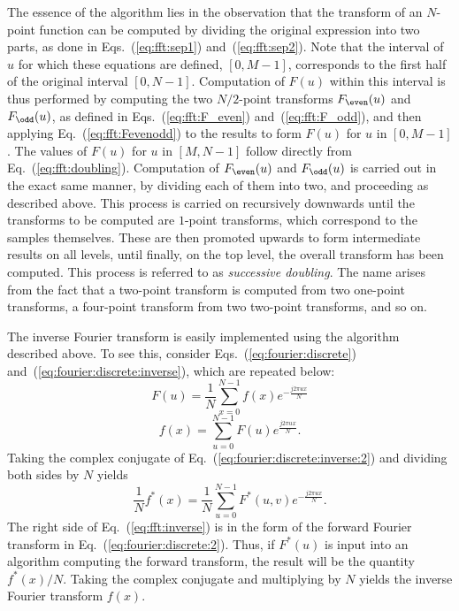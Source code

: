 The essence of the {\fft} algorithm lies in the observation that the
transform of an $N$-point function can be computed by dividing the
original expression into two parts, as done in
Eqs.~(\ref{eq:fft:sep1}) and~(\ref{eq:fft:sep2}).  Note that the
interval of $u$ for which these equations are defined, $[0,M-1]$,
corresponds to the first half of the original interval $[0,N-1]$.
Computation of $F(u)$ within this interval is thus performed by
computing the two $N/2$-point transforms $F_{\even}(u)$ and
$F_{\odd}(u)$, as defined in Eqs.~(\ref{eq:fft:F_even})
and~(\ref{eq:fft:F_odd}), and then applying
Eq.~(\ref{eq:fft:Fevenodd}) to the results to form $F(u)$ for $u$ in
$[0,M-1]$.  The values of $F(u)$ for $u$ in $[M,N-1]$ follow directly
from Eq.~(\ref{eq:fft:doubling}).  Computation of $F_{\even}(u)$ and
$F_{\odd}(u)$ is carried out in the exact same manner, by dividing
each of them into two, and proceeding as described above.  This
process is carried on recursively downwards until the transforms to be
computed are $1$-point transforms, which correspond to the samples
themselves.  These are then promoted upwards to form intermediate
results on all levels, until finally, on the top level, the overall
transform has been computed.  This process is referred to as {\em
  successive doubling\/}.  The name arises from the fact that a
two-point transform is computed from two one-point transforms, a
four-point transform from two two-point transforms, and so on.

The inverse Fourier transform is easily implemented using the {\fft}
algorithm described above.  To see this, consider
Eqs.~(\ref{eq:fourier:discrete})
and~(\ref{eq:fourier:discrete:inverse}), which are repeated below:
\begin{equation}
\label{eq:fourier:discrete:2}
  F(u)=\frac{1}{N}\sum_{x=0}^{N-1}f(x)e^{-\frac{j2\pi ux}{N}}
\end{equation}
\begin{equation}
\label{eq:fourier:discrete:inverse:2}
  f(x)=\sum_{u=0}^{N-1}F(u)e^{\frac{j2\pi ux}{N}}\mbox{.}
\end{equation}
Taking the complex conjugate of
Eq.~(\ref{eq:fourier:discrete:inverse:2}) and dividing both sides by
$N$ yields
\begin{equation}
\label{eq:fft:inverse}
  \frac{1}{N}f^{\ast}(x)=\frac{1}{N}\sum_{u=0}^{N-1}F^{\ast}(u,v)
  e^{-\frac{j2\pi ux}{N}}\mbox{.}
\end{equation}
The right side of Eq.~(\ref{eq:fft:inverse}) is in the form of the
forward Fourier transform in Eq.~(\ref{eq:fourier:discrete:2}).  Thus,
if $F^{\ast}(u)$ is input into an algorithm computing the forward
transform, the result will be the quantity $f^{\ast}(x)/N$.  Taking
the complex conjugate and multiplying by $N$ yields the inverse
Fourier transform $f(x)$.

